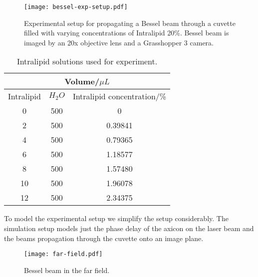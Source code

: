 \begin{figure}[ht!]
    \centering
    \texttt{[image: bessel-exp-setup.pdf]}
    \caption{Experimental setup for propagating a Bessel beam through a cuvette filled with varying concentrations of Intralipid 20\%. Bessel beam is imaged by an 20x objective lens and a Grasshopper 3 camera.}
    \label{fig:expsetup}
\end{figure}

\begin{table}[!ht]
    \centering
    \begin{tabular}{ccc}
    \hline
    \multicolumn{3}{c}{Volume/$\mu L$}                                               \\ \hline
    Intralipid              & $H_2O$                   & Intralipid concentration/\% \\ \hline
    \multicolumn{1}{c|}{0}  & \multicolumn{1}{c|}{500} & 0                           \\
    \multicolumn{1}{c|}{2}  & \multicolumn{1}{c|}{500} & 0.39841                     \\
    \multicolumn{1}{c|}{4}  & \multicolumn{1}{c|}{500} & 0.79365                     \\
    \multicolumn{1}{c|}{6}  & \multicolumn{1}{c|}{500} & 1.18577                     \\
    \multicolumn{1}{c|}{8}  & \multicolumn{1}{c|}{500} & 1.57480                     \\
    \multicolumn{1}{c|}{10} & \multicolumn{1}{c|}{500} & 1.96078                     \\
    \multicolumn{1}{c|}{12} & \multicolumn{1}{c|}{500} & 2.34375                     \\ \hline
    \end{tabular}
    \caption{Intralipid solutions used for experiment.}
    \label{tab:intra}
\end{table}


To model the experimental setup we simplify the setup considerably.
The simulation setup models just the phase delay of the axicon on the laser beam and the beams propagation through the cuvette onto an image plane. 


\begin{figure}
\centering
\texttt{[image: far-field.pdf]}
\caption{Bessel beam in the far field.}
\label{fig:farfield}
\end{figure}
